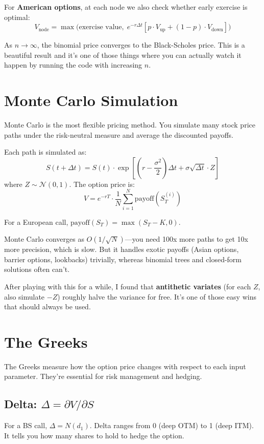 \documentclass[11pt]{article}
\begin{document}
For \textbf{American options}, at each node we also check whether early exercise is optimal:
\[
V_{\text{node}} = \max\!\big(\text{exercise value},\; e^{-r\Delta t}[p \cdot V_{\text{up}} + (1-p) \cdot V_{\text{down}}]\big)
\]

As $n \to \infty$, the binomial price converges to the Black-Scholes price. This is a beautiful result and it's one of those things where you can actually watch it happen by running the code with increasing $n$.

\section{Monte Carlo Simulation}

Monte Carlo is the most flexible pricing method. You simulate many stock price paths under the risk-neutral measure and average the discounted payoffs.

Each path is simulated as:
\[
S(t + \Delta t) = S(t) \cdot \exp\!\left[\left(r - \frac{\sigma^2}{2}\right)\Delta t + \sigma\sqrt{\Delta t} \cdot Z\right]
\]
where $Z \sim \mathcal{N}(0,1)$. The option price is:
\[
V = e^{-rT} \cdot \frac{1}{N}\sum_{i=1}^{N} \text{payoff}(S_T^{(i)})
\]

For a European call, $\text{payoff}(S_T) = \max(S_T - K, 0)$.

Monte Carlo converges as $O(1/\sqrt{N})$---you need 100x more paths to get 10x more precision, which is slow. But it handles exotic payoffs (Asian options, barrier options, lookbacks) trivially, whereas binomial trees and closed-form solutions often can't.

After playing with this for a while, I found that \textbf{antithetic variates} (for each $Z$, also simulate $-Z$) roughly halve the variance for free. It's one of those easy wins that should always be used.

\section{The Greeks}

The Greeks measure how the option price changes with respect to each input parameter. They're essential for risk management and hedging.

\subsection{Delta: $\Delta = \partial V / \partial S$}

For a BS call, $\Delta = N(d_1)$. Delta ranges from 0 (deep OTM) to 1 (deep ITM). It tells you how many shares to hold to hedge the option.
\end{document}
